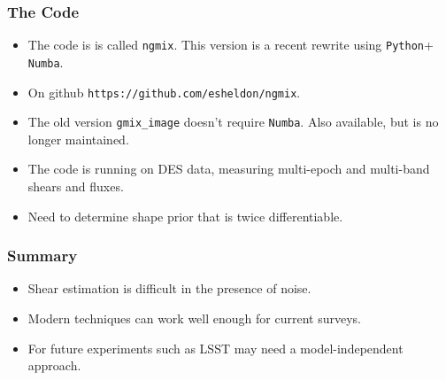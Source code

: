 \documentclass{beamer}
\newcommand{\numba}{\texttt{Numba}}
\newcommand{\python}{\texttt{Python}}
\newcommand{\ngmix}{\texttt{ngmix}}
\begin{document}
\frame
{
    \frametitle{The Code}

    \begin{itemize}

        \item The code is is called \ngmix.  This version is a recent rewrite
            using {\texttt \python + \numba}.

        \item On github  \texttt{https://github.com/esheldon/ngmix}. 
            
        \item The old version \texttt{gmix\_image} doesn't require \numba.
            Also available, but is no longer maintained.

        \item The code is running on DES data, measuring multi-epoch and
            multi-band shears and fluxes.  
            
        \item Need to determine shape prior that is twice differentiable.

    \end{itemize}
}
\frame
{
    \frametitle{Summary}

    \begin{itemize}

        \item Shear estimation is difficult in the presence of noise.

        \item Modern techniques can work well enough for current surveys.

        \item For future experiments such as LSST may need a model-independent
            approach.

    \end{itemize}
}
\end{document}
